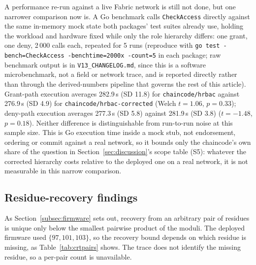 \documentclass[a4paper,fleqn]{cas-sc}
\begin{document}
A performance re-run against a live Fabric network is still not done, but
one narrower comparison now is. A Go benchmark calls \texttt{CheckAccess}
directly against the same in-memory mock state both packages' test suites
already use, holding the workload and hardware fixed while only the role
hierarchy differs: one grant, one deny, 2\,000 calls each, repeated for 5
runs (reproduce with \texttt{go test -bench=CheckAccess -benchtime=2000x
-count=5} in each package; raw benchmark output is in
\texttt{V13\_CHANGELOG.md}, since this is a software microbenchmark, not a
field or network trace, and is reported directly rather than through the
derived-numbers pipeline that governs the rest of this article). Grant-path
execution averages 282.9\,\textmu{}s (SD 11.8) for \texttt{chaincode/hrbac}
against 276.9\,\textmu{}s (SD 4.9) for \texttt{chaincode/hrbac-corrected}
(Welch $t=1.06$, $p=0.33$); deny-path execution averages 277.3\,\textmu{}s
(SD 5.8) against 281.9\,\textmu{}s (SD 3.8) ($t=-1.48$, $p=0.18$). Neither
difference is distinguishable from run-to-run noise at this sample size.
This is Go execution time inside a mock stub, not endorsement, ordering or
commit against a real network, so it bounds only the chaincode's own share
of the question in Section~\ref{sec:discussion}'s scope table (S5):
whatever the corrected hierarchy costs relative to the deployed one on a
real network, it is not measurable in this narrow comparison.

\subsection{Residue-recovery findings}
\label{subsec:pm_crt}

As Section~\ref{subsec:firmware} sets out, recovery from an arbitrary pair
of residues is unique only below the smallest pairwise product of the
moduli. The deployed firmware used $\{97, 101, 103\}$, so the recovery
bound depends on which residue is missing, as Table~\ref{tab:crtpairs}
shows. The trace does not identify the missing residue, so a per-pair count
is unavailable.
\end{document}
